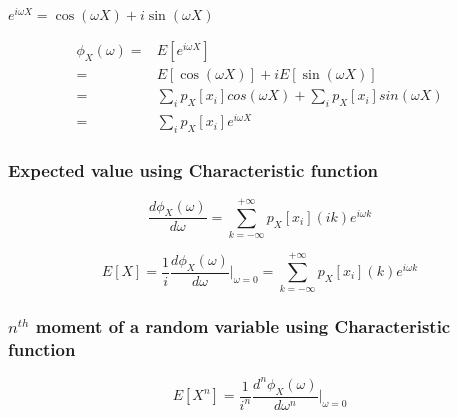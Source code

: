 $e^{i\omega X}=\cos(\omega X)+i\sin(\omega X)$

\begin{equation*}
	\begin{split}
		\phi_{X}(\omega) 
				 =& 
				 	E[e^{i\omega X}]\\
				 =& 
				 	E[\cos(\omega X)]+iE[\sin(\omega X)]\\ 
				 =&
				 	\sum_{i}p_{X}[x_{i}]cos(\omega X) + \sum_{i}p_{X}[x_{i}]sin(\omega X)\\
				 =&
				 	\sum_{i}p_{X}[x_{i}]e^{i\omega X}
	\end{split}
\end{equation*}



\subsubsection{Expected value using Characteristic function}
\begin{equation}
	\frac{d\phi_{X}(\omega)}{d\omega}=\sum_{k=-\infty}^{+\infty} p_{X}[x_{i}](ik)e^{i\omega k}
\end{equation}                                                

\begin{equation*}
	E[X]=\frac{1}{i}\frac{d\phi_{X}(\omega)}{d\omega}|_{\omega=0}=\sum_{k=-\infty}^{+\infty} p_{X}[x_{i}](k)e^{i\omega k}
\end{equation*}                                                
\newpage

\subsubsection{$n^{th}$ moment of a random variable using Characteristic function}
	
\begin{equation*}
	E[X^{n}]=\frac{1}{i^{n}}\frac{d^{n}\phi_{X}(\omega)}{d\omega^{n}}|_{\omega=0}
\end{equation*}                                                

